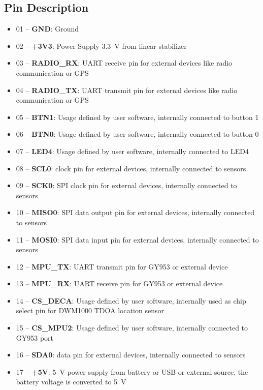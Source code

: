 \subsection{Pin Description}
\begin{itemize}
	\item 01 -- \textbf{GND}: Ground
	\item 02 -- \textbf{+3V3}: Power Supply \SI{+3.3}{V} from linear stabilizer
	\item 03 -- \textbf{RADIO\_RX}: UART receive pin for external devices like radio communication or GPS
	\item 04 -- \textbf{RADIO\_TX}: UART transmit pin for external devices like radio communication or GPS
	\item 05 -- \textbf{BTN1}: Usage defined by user software, internally connected to button 1
	\item 06 -- \textbf{BTN0}: Usage defined by user software, internally connected to button 0
	\item 07 -- \textbf{LED4}: Usage defined by user software, internally connected to LED4
	\item 08 -- \textbf{SCL0}: \itwoc clock pin for external devices, internally connected to sensors
	\item 09 -- \textbf{SCK0}: SPI clock pin for external devices, internally connected to sensors
	\item 10 -- \textbf{MISO0}: SPI data output pin for external devices, internally connected to sensors
	\item 11 -- \textbf{MOSI0}: SPI data input pin for external devices, internally connected to sensors
	\item 12 -- \textbf{MPU\_TX}: UART transmit pin for GY953 or external device
	\item 13 -- \textbf{MPU\_RX}: UART receive pin for GY953 or external device
	\item 14 -- \textbf{CS\_DECA}: Usage defined by user software, internally used as chip select pin for DWM1000 TDOA location sensor
	\item 15 -- \textbf{CS\_MPU2}: Usage defined by user software, internally connected to GY953 port
	\item 16 -- \textbf{SDA0}: \itwoc data pin for external devices, internally connected to sensors
	\item 17 -- \textbf{+5V}: \SI{+5}{V} power supply from battery or USB or external source, the battery voltage is converted to \SI{5}{V}
\end{itemize}

